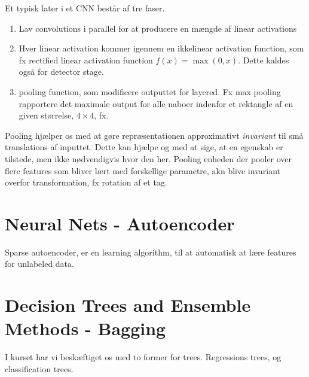 \documentclass[paper=a4, fontsize=11pt]{scrartcl} %
\numberwithin{equation}{section} %
\numberwithin{figure}{section} %
\numberwithin{table}{section} %
\begin{document}
	Et typisk later i et CNN består af tre faser. 
	\begin{enumerate}
		\item Lav convolutions i parallel for at producere en mængde af linear activations
		\item Hver linear activation kommer igennem en ikkelinear activation function, som fx rectified linear activation function $f(x)=\max(0,x)$. Dette kaldes også for detector stage.
		\item pooling function, som modificere outputtet for layered. Fx max pooling rapportere det maximale output for alle naboer indenfor et rektangle af en given størrelse, $4\times4$, fx.
	\end{enumerate}
	Pooling hjælper os med at gøre repræsentationen approximativt \textit{invariant} til små translations af inputtet. Dette kan hjælpe og med at sige, at en egenskab er tilstede, men ikke nødvendigvis hvor den her. Pooling enheden der pooler over flere features som bliver lært med forskellige parametre, akn blive invariant overfor transformation, fx rotation af et tag.
	
	\newpage
	
	\section*{Neural Nets - Autoencoder}
	
	Sparse autoencoder, er en learning algorithm, til at automatisk at lære features for unlabeled data.
	
	\newpage
	
	\section*{Decision Trees and Ensemble Methods - Bagging}
	I kurset har vi beskæftiget os med to former for trees. Regressions trees, og classification trees. \\
	
\end{document}
